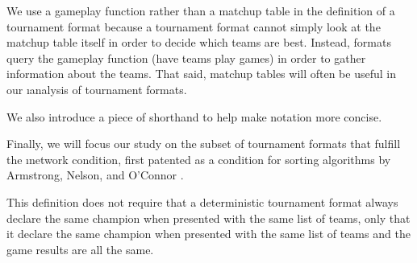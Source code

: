 {    We use a gameplay function rather than a matchup table in the definition of a tournament format because a tournament format cannot simply look at the matchup table itself in order to decide which teams are best. Instead, formats query the gameplay function (have teams play games) in order to gather information about the teams. That said, matchup tables will often be useful in our \i{analysis} of tournament formats. 

    We also introduce a piece of shorthand to help make notation more concise.


    Finally, we will focus our study on the subset of tournament formats that fulfill the \i{network condition}, first patented as a condition for sorting algorithms by Armstrong, Nelson, and O'Connor \cite{pat}.


    This definition does not require that a deterministic tournament format always declare the same champion when presented with the same list of teams, only that it declare the same champion when presented with the same list of teams and the game results are all the same.

}